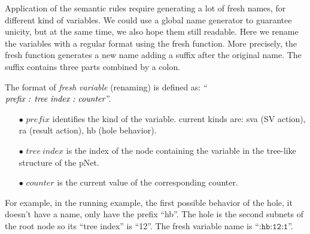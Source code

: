 \documentclass{lncs/llncs}
\newcommand{\TODO}[1]{\textcolor{red}{\textbf{[TODO:#1]}}}
\newcommand{\OTvar}{\texttt}
\begin{document}
Application of the semantic rules require generating a lot of fresh
names, for different kind of variables. We could use a global name
generator to guarantee unicity, but 
at the same time, we also hope them still
readable. Here we rename the variables with a regular format using the fresh function.
More precisely, the fresh function generates a new name adding a
suffix after the original name. The suffix contains three parts
combined by a colon.  


\begin{definition}\label{fresh-variable}
The format of \emph{fresh variable} (renaming) is defined as:
``$\emph{prefix : tree\ index\ :\ counter}$''.
\begin{itemize}
   \item[$\bullet$] $prefix$ identifies the kind of the
     variable. current kinds are: sva (SV action), ra (result action), hb (hole behavior).
   \item[$\bullet$] $tree\ index$ is the index of the node containing the variable in the tree-like structure of the pNet.
   \item[$\bullet$] $counter$ is the current value of the corresponding counter.
\end{itemize}
\end{definition}



For example, in the running example, the first possible behavior of
the hole, it doesn't have a name, only have the prefix ``hb''. The
hole is the second subnets of the root node so its ``tree index'' is
``12''. The fresh variable name is ``$\OTvar{:hb:12:1}$''. 
\end{document}
